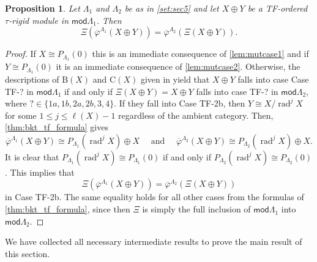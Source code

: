 \documentclass[11pt]{amsart}
\newcommand{\mods}{\mathsf{mod}}
\newcommand{\bcomp}{\mathrm{B}}
\newcommand{\ccomp}{\mathrm{C}}
\DeclareMathOperator{\rad}{\mathrm{rad}}
\newtheorem{proposition}[theorem]{Proposition}
\theoremstyle{definition}
\begin{document}
\begin{proposition}\label{prop:mutationstep}
    Let $\Lambda_1$ and $\Lambda_2$ be as in \cref{set:sec5} and let $X \oplus Y$ be a TF-ordered $\tau$-rigid module in $\mods \Lambda_1$. Then
    \[ \Xi(\overline{\varphi}^{\Lambda_1}(X \oplus Y)) = \overline{\varphi}^{\Lambda_2}(\Xi(X \oplus Y)).\]
\end{proposition}
\begin{proof}
    If $X \cong P_{\Lambda_1}(0)$ this is an immediate consequence of \cref{lem:mutcase1} and if $Y \cong P_{\Lambda_1}(0)$ it is an immediate consequence of \cref{lem:mutcase2}. Otherwise, the descriptions of $\bcomp(X)$ and $\ccomp(X)$ given in \cite[Prop. 4.9, Prop. 4.11]{bkt} yield that $X \oplus Y$ falls into case Case TF-? in $\mods \Lambda_1$ if and only if $\Xi(X \oplus Y) = X \oplus Y$ falls into case TF-?  in $\mods \Lambda_2$, where $? \in \{1a, 1b, 2a, 2b, 3 , 4\}$. If they fall into Case TF-2b, then $Y \cong X/\rad^j X$ for some $1 \leq j \leq \ell(X)-1$ regardless of the ambient category. Then, \cref{thm:bkt_tf_formula} gives
    \[ \overline{\varphi}^{\Lambda_1}(X \oplus Y) \cong P_{\Lambda_1}(\rad^j X) \oplus X \quad \text{ and } \quad \overline{\varphi}^{\Lambda_2}(X \oplus Y) \cong P_{\Lambda_2}(\rad^j X) \oplus X.\]
    It is clear that $P_{\Lambda_1}(\rad^j X) \cong P_{\Lambda_1}(0)$ if and only if $ P_{\Lambda_2}(\rad^j X) \cong P_{\Lambda_2}(0)$. This implies that 
    \[ \Xi(\overline{\varphi}^{\Lambda_1}(X \oplus Y)) = \overline{\varphi}^{\Lambda_2}(\Xi(X \oplus Y))\]
    in Case TF-2b. The same equality holds for all other cases from the formulas of \cref{thm:bkt_tf_formula}, since then $\Xi$ is simply the full inclusion of $\mods \Lambda_1$ into $\mods \Lambda_2$.
\end{proof}


We have collected all necessary intermediate results to prove the main result of this section. 
\end{document}
